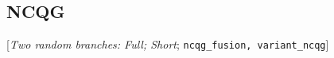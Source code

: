  \subsection*{NCQG} 
 [\textit{Two random branches: Full; Short}; %
 \verb|ncqg_fusion, variant_ncqg|] 
 \begin{enumerate}[resume] 


\end{enumerate}

